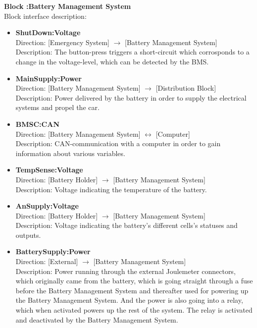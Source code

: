 \textbf{Block :Battery Management System}\\
Block interface description:
\begin{itemize}
	\item \textbf{ShutDown:Voltage}\\
	Direction: [Emergency System] $\rightarrow$ [Battery Management System]\\
	Description: The button-press triggers a short-circuit which corrosponds to a change in the voltage-level, which can be detected by the BMS.
	\item \textbf{MainSupply:Power}\\
	Direction: [Battery Management System] $\rightarrow$ [Distribution Block]\\
	Description: Power delivered by the battery in order to supply the electrical systems and propel the car.
	\item \textbf{BMSC:CAN}\\
	Direction: [Battery Management System] $\leftrightarrow$ [Computer]\\
	Description: CAN-communication with a computer in order to gain information about various variables.
	\item \textbf{TempSense:Voltage}\\
	Direction: [Battery Holder] $\rightarrow$ [Battery Management System]\\
	Description: Voltage indicating the temperature of the battery.
	\item \textbf{AnSupply:Voltage}\\
	Direction: [Battery Holder] $\rightarrow$ [Battery Management System]\\
	Description: Voltage indicating the battery's different cells's statuses and outputs.
	\item \textbf{BatterySupply:Power}\\
	Direction: [External] $\rightarrow$ [Battery Management System]\\
	Description: Power running through the external Joulemeter connectors, which originally came from the battery, which is going straight through a fuse before the Battery Management System and thereafter used for powering up the Battery Management System. And the power is also going into a relay, which when activated powers up the rest of the system. The relay is activated and deactivated by the Battery Management System.
\end{itemize}

